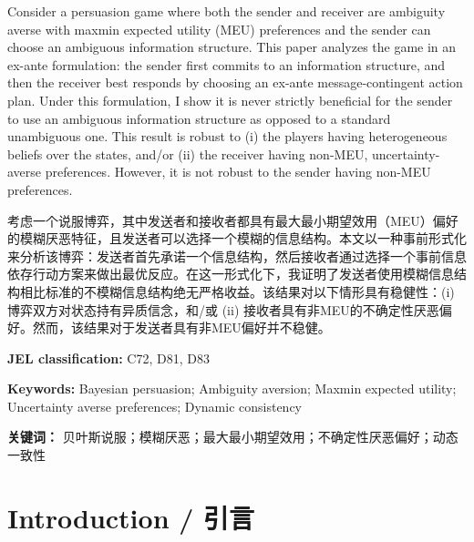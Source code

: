\documentclass[12pt,a4paper]{article}
\theoremstyle{definition}
\theoremstyle{remark}
\newenvironment{original}{%
    \par\medskip\noindent%
    \begin{tcolorbox}[%
        colback=white,%
        colframe=black!50,%
        title=\textbf{Original English},%
        fonttitle=\small\bfseries,%
        left=0pt, right=0pt, top=2pt, bottom=2pt,%
        boxrule=0.5pt,%
        arc=0pt,%
        outer arc=0pt%
    ]%
    \small%
}{%
    \end{tcolorbox}%
}
\newenvironment{translation}{%
    \par\smallskip\noindent%
    \begin{tcolorbox}[%
        colback=blue!3!white,%
        colframe=blue!40!black,%
        title=\textbf{中文翻译},%
        fonttitle=\small\bfseries,%
        left=0pt, right=0pt, top=2pt, bottom=2pt,%
        boxrule=0.5pt,%
        arc=0pt,%
        outer arc=0pt%
    ]%
    \small\color{blue!60!black}%
}{%
    \end{tcolorbox}\medskip%
}
\begin{document}
\begin{original}
Consider a persuasion game where both the sender and receiver are ambiguity averse with maxmin expected utility (MEU) preferences and the sender can choose an ambiguous information structure. This paper analyzes the game in an ex-ante formulation: the sender first commits to an information structure, and then the receiver best responds by choosing an ex-ante message-contingent action plan. Under this formulation, I show it is never strictly beneficial for the sender to use an ambiguous information structure as opposed to a standard unambiguous one. This result is robust to (i) the players having heterogeneous beliefs over the states, and/or (ii) the receiver having non-MEU, uncertainty-averse preferences. However, it is not robust to the sender having non-MEU preferences.
\end{original}
\begin{translation}
考虑一个说服博弈，其中发送者和接收者都具有最大最小期望效用（MEU）偏好的模糊厌恶特征，且发送者可以选择一个模糊的信息结构。本文以一种事前形式化来分析该博弈：发送者首先承诺一个信息结构，然后接收者通过选择一个事前信息依存行动方案来做出最优反应。在这一形式化下，我证明了发送者使用模糊信息结构相比标准的不模糊信息结构绝无严格收益。该结果对以下情形具有稳健性：(i) 博弈双方对状态持有异质信念，和/或 (ii) 接收者具有非MEU的不确定性厌恶偏好。然而，该结果对于发送者具有非MEU偏好并不稳健。
\end{translation}

\bigskip
\noindent\textbf{JEL classification:} C72, D81, D83

\noindent\textbf{Keywords:} Bayesian persuasion; Ambiguity aversion; Maxmin expected utility; Uncertainty averse preferences; Dynamic consistency

\noindent\textbf{关键词：} 贝叶斯说服；模糊厌恶；最大最小期望效用；不确定性厌恶偏好；动态一致性

\newpage

\section{Introduction / 引言}
\end{document}
